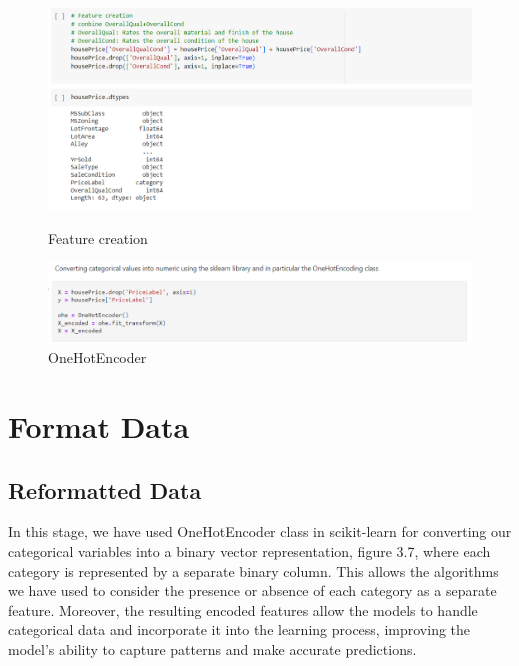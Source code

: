 \begin{figure}%
\begin{center}
    \includegraphics[scale=0.5]{imgs/feature_creation.png}
    \centering
    \caption{Feature creation}
    \vspace{15pt}
    \includegraphics[scale=0.5]{imgs/one_hot_encoder.png}
    \centering
    \caption{OneHotEncoder}
\end{center}
\hrulefill\vspace{15pt}\par
\end{figure}


\section{Format Data}

\subsection{Reformatted Data}

In this stage, we have used OneHotEncoder class in scikit-learn for converting our categorical variables into a binary vector representation, figure 3.7, where each category is represented by a separate binary column. This allows the algorithms we have used to consider the presence or absence of each category as a separate feature.
Moreover, the resulting encoded features allow the models to handle categorical data and incorporate it into the learning process, improving the model's ability to capture patterns and make accurate predictions.